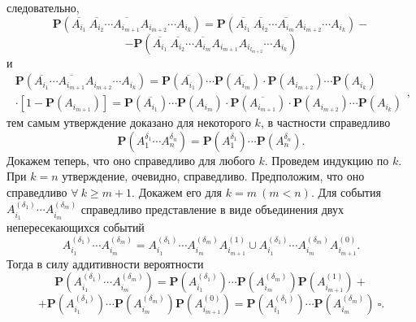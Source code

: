 \documentclass[oneside,final,14pt]{extreport}
\theoremstyle{definition}
\begin{document}
следовательно,
$$\mathbf{P}\left(\overline{A_{i_{1}}}~\overline{A_{i_{2}}} \cdots \overline{A_{i_{m+1}}} A_{i_{m+2}} \cdots A_{i_{k}}\right)=\mathbf{P}\left(\overline{A_{i_{1}}}~\overline{A_{i_{2}}} \cdots \overline{A_{i_{m}}} A_{i_{m+2}} \cdots A_{i_{k}}\right)-$$$$-\mathbf{P}\left(\overline{A_{i_{1}}}~\overline{A_{i_{2}}} \cdots \overline{A_{i_{m}}} A_{i_{m+1}} A_{i_{l_{m+2}}} \cdots A_{i_{k}}\right)$$
и
$$\begin{array}{c}
\mathbf{P}\left(\overline{A_{i_{1}}} \cdots \overline{A_{i_{m+1}}} A_{i_{m+2}} \cdots A_{i_{k}}\right)=\mathbf{P}(\overline{A_{i_{1}}}) \cdots \mathbf{P}(\overline{A_{i_{m}}}) \cdot \mathbf{P}\left(A_{i_{m+2}}\right) \cdots \mathbf{P}\left(A_{i_{k}}\right)
\\
\cdot\left[1-\mathbf{P}\left(A_{i_{m+1}}\right)\right]=
\mathbf{P}(\overline{A_{i_{1}}}) \cdots \mathbf{P}\left(A_{i_{m}}\right) \cdot \mathbf{P}(\overline{A_{i_{m+1}}}) \cdot \mathbf{P}\left(A_{i_{m+2}}\right) \cdots \mathbf{P}\left(A_{i_{k}}\right)
\end{array},$$
тем самым утверждение доказано для некоторого $k$, в частности справедливо
$$\mathbf{P}\left(A_{1}^{\delta_{1}} \cdots A_{n}^{\delta_{n}}\right)=\mathbf{P}\left(A_{1}^{\delta_{1}}\right) \cdots \mathbf{P}\left(A_{n}^{\delta_{n}}\right).$$
Докажем теперь, что оно справедливо для любого $k$. Проведем индукцию по $k$. При $k = n$ утверждение, очевидно, справедливо. Предположим, что оно справедливо $\forall~k \geq m + 1.$ Докажем его для $k = m~(m < n)$. Для события $A_{i_1}^{(\delta_1)}\cdots A_{i_m}^{(\delta_m)}$ справедливо представление в виде объединения двух непересекающихся событий
$$A_{i_{1}}^{\left(\delta_{1}\right)} \cdots A_{i_{m}}^{\left(\delta_{m}\right)}=A_{i_{1}}^{\left(\delta_{1}\right)} \cdots A_{i_{m}}^{\left(\delta_{m}\right)} A_{i_{m+1}}^{(1)} \cup A_{i_{1}}^{\left(\delta_{1}\right)} \cdots A_{i_{m}}^{\left(\delta_{m}\right)} A_{i_{m+1}}^{(0)}.$$
Тогда в силу аддитивности вероятности 
$$\mathbf{P}\left(A_{i_{1}}^{\left(\delta_{1}\right)} \cdots A_{i_{m}}^{\left(\delta_{m}\right)}\right)=\mathbf{P}\left(A_{i_{1}}^{\left(\delta_{1}\right)}\right) \cdots \mathbf{P}\left(A_{i_{m}}^{\left(\delta_{m}\right)}\right) \mathbf{P}\left(A_{i_{m+1}}^{(1)}\right)+$$$$+\mathbf{P}\left(A_{i_{1}}^{\left(\delta_{1}\right)}\right) \cdots \mathbf{P}\left(A_{i_{m}}^{\left(\delta_{m}\right)}\right) \mathbf{P}\left(A_{i_{m+1}}^{(0)}\right)
=\mathbf{P}\left(A_{i_{1}}^{\left(\delta_{1}\right)}\right) \cdots \mathbf{P}\left(A_{i_{m}}^{\left(\delta_{m}\right)}\right) ~ \square.$$
\end{document}
